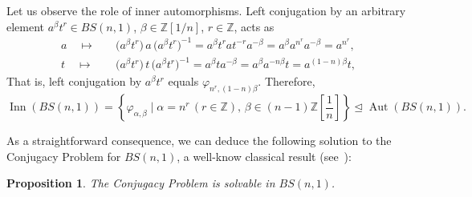 \documentclass[english]{amsart}
\newtheorem{prop}[thm]{Proposition}
\theoremstyle{definition}
\newcommand\ZZ{\mathbb{Z}}
\newcommand{\Aut}{\operatorname{Aut}}
\newcommand{\Inn}{\operatorname{Inn}}
\begin{document}
Let us observe the role of inner automorphisms. Left conjugation by an arbitrary element $a^{\beta}t^r\in BS(n,1)$, $\beta\in \ZZ[1/n]$, $r\in \ZZ$, acts as
 \begin{align*}
a\quad \mapsto \quad & \big( a^{\beta} t^r \big)\, a \,\big( a^{\beta} t^r \big)^{-1}= a^{\beta}t^r a t^{-r} a^{-\beta} =a^{\beta}a^{n^r} a^{-\beta} =a^{n^r}, \\ t \quad \mapsto \quad & \big( a^{\beta} t^r \big)\, t \,\big( a^{\beta} t^r \big)^{-1}= a^{\beta}t a^{-\beta} =a^{\beta}a^{-n\beta} t=a^{(1-n)\beta}t, 
 \end{align*}
That is, left conjugation by $a^{\beta}t^r$ equals $\varphi_{n^r,(1-n)\beta}$. Therefore, 
 $$
\Inn (BS(n,1))=\left\{ \varphi_{\alpha, \beta} \mid \alpha =n^r\, (r\in \ZZ),\, \beta\in (n-1)\ZZ[\frac{1}{n}] \right\} \unlhd \Aut(BS(n,1)).
 $$

As a straightforward consequence, we can deduce the following solution to the Conjugacy Problem for $BS(n,1)$, a well-know classical result (see~\cite{Anshel-Stebe}):

\begin{prop}\label{prop: CP}
The Conjugacy Problem is solvable in $BS(n,1)$.
\end{prop}
\end{document}
